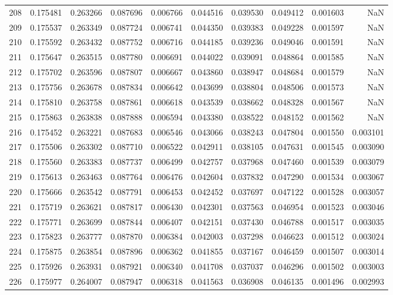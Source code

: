 \begin{tabular}{lrrrrrrrrr}
208 & 0.175481 & 0.263266 & 0.087696 & 0.006766 & 0.044516 & 0.039530 & 0.049412 & 0.001603 & NaN \\
209 & 0.175537 & 0.263349 & 0.087724 & 0.006741 & 0.044350 & 0.039383 & 0.049228 & 0.001597 & NaN \\
210 & 0.175592 & 0.263432 & 0.087752 & 0.006716 & 0.044185 & 0.039236 & 0.049046 & 0.001591 & NaN \\
211 & 0.175647 & 0.263515 & 0.087780 & 0.006691 & 0.044022 & 0.039091 & 0.048864 & 0.001585 & NaN \\
212 & 0.175702 & 0.263596 & 0.087807 & 0.006667 & 0.043860 & 0.038947 & 0.048684 & 0.001579 & NaN \\
213 & 0.175756 & 0.263678 & 0.087834 & 0.006642 & 0.043699 & 0.038804 & 0.048506 & 0.001573 & NaN \\
214 & 0.175810 & 0.263758 & 0.087861 & 0.006618 & 0.043539 & 0.038662 & 0.048328 & 0.001567 & NaN \\
215 & 0.175863 & 0.263838 & 0.087888 & 0.006594 & 0.043380 & 0.038522 & 0.048152 & 0.001562 & NaN \\
216 & 0.175452 & 0.263221 & 0.087683 & 0.006546 & 0.043066 & 0.038243 & 0.047804 & 0.001550 & 0.003101 \\
217 & 0.175506 & 0.263302 & 0.087710 & 0.006522 & 0.042911 & 0.038105 & 0.047631 & 0.001545 & 0.003090 \\
218 & 0.175560 & 0.263383 & 0.087737 & 0.006499 & 0.042757 & 0.037968 & 0.047460 & 0.001539 & 0.003079 \\
219 & 0.175613 & 0.263463 & 0.087764 & 0.006476 & 0.042604 & 0.037832 & 0.047290 & 0.001534 & 0.003067 \\
220 & 0.175666 & 0.263542 & 0.087791 & 0.006453 & 0.042452 & 0.037697 & 0.047122 & 0.001528 & 0.003057 \\
221 & 0.175719 & 0.263621 & 0.087817 & 0.006430 & 0.042301 & 0.037563 & 0.046954 & 0.001523 & 0.003046 \\
222 & 0.175771 & 0.263699 & 0.087844 & 0.006407 & 0.042151 & 0.037430 & 0.046788 & 0.001517 & 0.003035 \\
223 & 0.175823 & 0.263777 & 0.087870 & 0.006384 & 0.042003 & 0.037298 & 0.046623 & 0.001512 & 0.003024 \\
224 & 0.175875 & 0.263854 & 0.087896 & 0.006362 & 0.041855 & 0.037167 & 0.046459 & 0.001507 & 0.003014 \\
225 & 0.175926 & 0.263931 & 0.087921 & 0.006340 & 0.041708 & 0.037037 & 0.046296 & 0.001502 & 0.003003 \\
226 & 0.175977 & 0.264007 & 0.087947 & 0.006318 & 0.041563 & 0.036908 & 0.046135 & 0.001496 & 0.002993 \\

\end{tabular}
